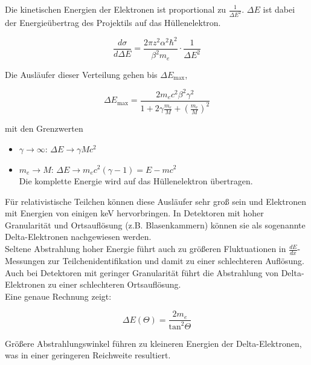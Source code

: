 Die kinetischen Energien der Elektronen ist proportional zu $\frac{1}{\Delta E^2}$. $\Delta E$ ist
dabei der Energieübertrag des Projektils auf das Hüllenelektron.

\[\frac{d\sigma}{d\Delta E} = \frac{2\pi z^2 \alpha^2 \hbar^2}{\beta^2 m_e}\cdot \frac{1}{\Delta
E^2}
\]

Die Ausläufer dieser Verteilung gehen bis $\Delta E_\text{max}$,

\[\Delta E_\text{max} = \frac{2m_e c^2 \beta^2 \gamma^2}{1+ 2\gamma
\frac{m_e}{M}+\left( \frac{m_e}{M} \right)^2}
\]

mit den Grenzwerten
\begin{itemize}
  \item $\gamma\rightarrow\infty$: $\Delta E \rightarrow \gamma Mc^2$
  \item $m_e \rightarrow M$: $\Delta E \rightarrow m_e c^2 (\gamma -1) = E- m c^2$ \\
  		Die komplette Energie wird auf das Hüllenelektron übertragen.
\end{itemize}

Für relativistische Teilchen können diese Ausläufer sehr groß sein und Elektronen mit Energien von
einigen keV hervorbringen. In Detektoren mit hoher Granularität und Ortsauflösung (z.B.
Blasenkammern) können sie als sogenannte Delta-Elektronen nachgewiesen werden.
\\
Seltene Abstrahlung hoher Energie führt auch zu größeren Fluktuationen in $\frac{dE}{dx}$-Messungen
zur Teilchenidentifikation und damit zu einer schlechteren Auflösung. Auch bei Detektoren mit
geringer Granularität führt die Abstrahlung von Delta-Elektronen zu einer schlechteren
Ortsauflösung.
\\
Eine genaue Rechnung zeigt: 

\[\Delta E (\Theta) = \frac{2m_e}{\text{tan}^2\Theta} \]

Größere Abstrahlungswinkel führen zu kleineren Energien der Delta-Elektronen, was in einer
geringeren Reichweite resultiert.
